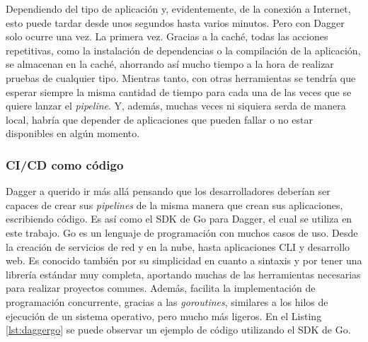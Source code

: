 Dependiendo del tipo de aplicación y, evidentemente, de la conexión a Internet, esto puede tardar desde unos segundos hasta varios minutos. Pero con Dagger solo ocurre una vez. La primera vez. Gracias a la caché, todas las acciones repetitivas, como la instalación de dependencias o la compilación de la aplicación, se almacenan en la caché, ahorrando así mucho tiempo a la hora de realizar pruebas de cualquier tipo. Mientras tanto, con otras herramientas se tendría que esperar siempre la misma cantidad de tiempo para cada una de las veces que se quiere lanzar el \textit{pipeline}. Y, además, muchas veces ni siquiera serda de manera local, habría que depender de aplicaciones que pueden fallar o no estar disponibles en algún momento.

\subsubsection*{CI/CD como código}

Dagger a querido ir más allá pensando que los desarrolladores deberían ser capaces de crear sus \textit{pipelines} de la misma manera que crean sus aplicaciones, escribiendo código. Es así como el SDK de Go\cite{go} para Dagger, el cual se utiliza en este trabajo. Go es un lenguaje de programación con muchos casos de uso. Desde la creación de servicios de red y en la nube, hasta aplicaciones CLI y desarrollo web. Es conocido también por su simplicidad en cuanto a sintaxis y por tener una librería estándar muy completa, aportando muchas de las herramientas necesarias para realizar proyectos comunes. Además, facilita la implementación de programación concurrente, gracias a las \textit{goroutines}, similares a los hilos de ejecución de un sistema operativo, pero mucho más ligeros. En el Listing \ref{lst:daggergo} se puede observar un ejemplo de código\cite{daggergo} utilizando el SDK de Go.

